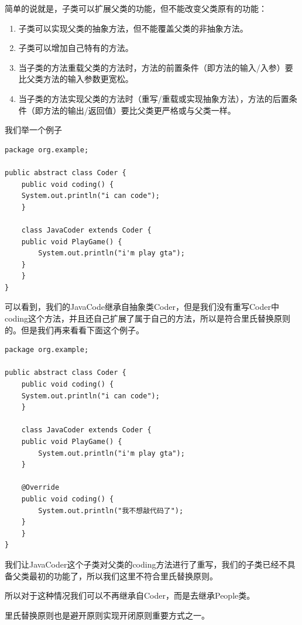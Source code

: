 \documentclass[11pt]{article}
\begin{document}
简单的说就是，子类可以扩展父类的功能，但不能改变父类原有的功能：

\begin{enumerate}
\item 子类可以实现父类的抽象方法，但不能覆盖父类的非抽象方法。
\item 子类可以增加自己特有的方法。
\item 当子类的方法重载父类的方法时，方法的前置条件（即方法的输入/入参）要比父类方法的输入参数更宽松。
\item 当子类的方法实现父类的方法时（重写/重载或实现抽象方法），方法的后置条件（即方法的输出/返回值）要比父类更严格或与父类一样。
\end{enumerate}


我们举一个例子
\begin{verbatim}
package org.example;

public abstract class Coder {
    public void coding() {
	System.out.println("i can code");
    }

    class JavaCoder extends Coder {
	public void PlayGame() {
	    System.out.println("i'm play gta");
	}
    }
}
\end{verbatim}
可以看到，我们的JavaCode继承自抽象类Coder，但是我们没有重写Coder中coding这个方法，并且还自己扩展了属于自己的方法，所以是符合里氏替换原则的。但是我们再来看看下面这个例子。
\begin{verbatim}
package org.example;

public abstract class Coder {
    public void coding() {
	System.out.println("i can code");
    }

    class JavaCoder extends Coder {
	public void PlayGame() {
	    System.out.println("i'm play gta");
	}

	@Override
	public void coding() {
	    System.out.println("我不想敲代码了");
	}
    }
}
\end{verbatim}
我们让JavaCoder这个子类对父类的coding方法进行了重写，我们的子类已经不具备父类最初的功能了，所以我们这里不符合里氏替换原则。

所以对于这种情况我们可以不再继承自Coder，而是去继承People类。

里氏替换原则也是避开原则实现开闭原则重要方式之一。
\end{document}
